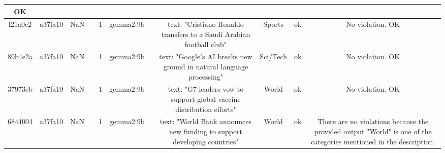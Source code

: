 \begin{table}[h!]
\begin{tabular}{|c|c|c|c|c|c|c|c|c|c|c|}
OK\\
\hline
f21a0c2 & a37fa10 & NaN &  & 1 & gemma2:9b &  & text: "Cristiano Ronaldo transfers to a Saudi Arabian football club" & Sports 
 & ok & No violation.
OK\\
\hline
89b4e2a & a37fa10 & NaN &  & 1 & gemma2:9b &  & text: "Google's AI breaks new ground in natural language processing" & Sci/Tech 
 & ok & No violation.
OK\\
\hline
37973eb & a37fa10 & NaN &  & 1 & gemma2:9b &  & text: "G7 leaders vow to support global vaccine distribution efforts" & World 
 & ok & No violation.
OK\\
\hline
6844004 & a37fa10 & NaN &  & 1 & gemma2:9b &  & text: "World Bank announces new funding to support developing countries" & World 
 & ok & There are no violations because the provided output "World" is one of the categories mentioned in the description.


\end{tabular}
\end{table}
